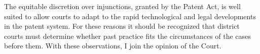 The equitable discretion over injunctions, granted by the Patent Act, is well
suited to allow courts to adapt to the rapid technological and legal
developments in the patent system. For these reasons it should be recognized
that district courts must determine whether past practice fits the circumstances
of the cases before them. With these observations, I join the opinion of the
Court.

